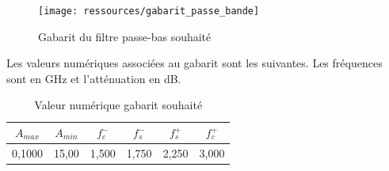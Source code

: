 \documentclass[french]{article}
\begin{document}
\begin{figure}[H]
	\centering
	\texttt{[image: ressources/gabarit\_passe\_bande]}
	\caption{Gabarit du filtre passe-bas souhaité}
	\label{fig:gab}
\end{figure}
Les valeurs numériques associées au gabarit sont les suivantes. Les fréquences sont en GHz et l'atténuation en dB. 
	\begin{table}[H]
		\centering
\begin{tabular}{|c|c|c|c|c|c|}
		\hline
	$A_{max}$& $A_{min}$ & $f_c^-$ & $f_s^-$ & $f_s^+$ &$f_c^+$ \\ \hline
	0,1000	 & 15,00 		& 1,500	   & 1,750 & 2,250& 3,000 \\ \hline
	\end{tabular}
\caption{Valeur numérique gabarit souhaité}
	\end{table}
\end{document}
